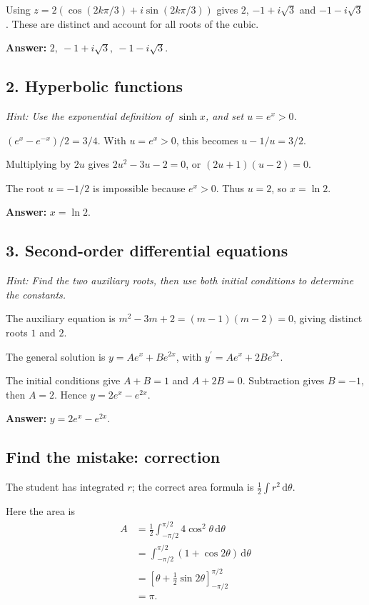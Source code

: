\documentclass[10pt,a4paper]{article}
\begin{document}
Using \(z=2(\cos(2k\pi/3)+i\sin(2k\pi/3))\) gives \(2\), \(-1+i\sqrt3\) and \(-1-i\sqrt3\). These are distinct and account for all roots of the cubic.

\textbf{Answer:} \(2,\ -1+i\sqrt3,\ -1-i\sqrt3\).

\subsection*{2. Hyperbolic functions}
\textit{Hint: Use the exponential definition of \(\sinh x\), and set \(u=e^x>0\).}\par
\((e^x-e^{-x})/2=3/4\). With \(u=e^x>0\), this becomes \(u-1/u=3/2\).

Multiplying by \(2u\) gives \(2u^2-3u-2=0\), or \((2u+1)(u-2)=0\).

The root \(u=-1/2\) is impossible because \(e^x>0\). Thus \(u=2\), so \(x=\ln2\).

\textbf{Answer:} \(x=\ln2\).

\subsection*{3. Second-order differential equations}
\textit{Hint: Find the two auxiliary roots, then use both initial conditions to determine the constants.}\par
The auxiliary equation is \(m^2-3m+2=(m-1)(m-2)=0\), giving distinct roots \(1\) and \(2\).

The general solution is \(y=Ae^x+Be^{2x}\), with \(y^{\prime}=Ae^x+2Be^{2x}\).

The initial conditions give \(A+B=1\) and \(A+2B=0\). Subtraction gives \(B=-1\), then \(A=2\). Hence \(y=2e^x-e^{2x}\).

\textbf{Answer:} \(y=2e^x-e^{2x}\).

\subsection*{Find the mistake: correction}
The student has integrated \(r\); the correct area formula is \(\tfrac12\int r^2\,\mathrm{d}\theta\).

Here the area is \[\begin{aligned}A&=\frac12\int_{-\pi/2}^{\pi/2}4\cos^2\theta\,\mathrm{d}\theta\\&=\int_{-\pi/2}^{\pi/2}(1+\cos2\theta)\,\mathrm{d}\theta\\&=\left[\theta+\frac12\sin2\theta\right]_{-\pi/2}^{\pi/2}\\&=\pi.\end{aligned}\]
\end{document}
